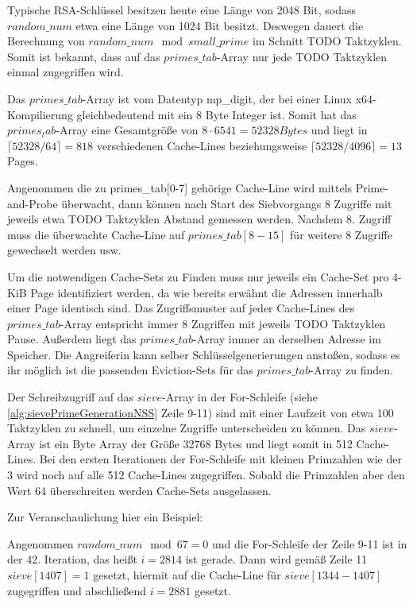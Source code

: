 Typische RSA-Schlüssel besitzen heute eine Länge von 2048 Bit, sodass $random\_num$ etwa eine Länge von 1024 Bit besitzt.
Deswegen dauert die Berechnung von $random\_num \mod small\_prime$ im Schnitt TODO Taktzyklen.
Somit ist bekannt, dass auf das $primes\_tab$-Array nur jede TODO Taktzyklen einmal zugegriffen wird.

Das $primes\_tab$-Array ist vom Datentyp mp_digit, der bei einer Linux x64-Kompilierung gleichbedeutend mit ein 8 Byte Integer ist.
Somit hat das $primes_tab$-Array eine Gesamtgröße von $8 \cdot 6541 = 52328 Bytes$ und liegt in $\lceil 52328 / 64 \rceil = 818$ verschiedenen Cache-Lines beziehungsweise $\lceil 52328 / 4096 \rceil = 13$ Pages.

Angenommen die zu primes_tab[0-7] gehörige Cache-Line wird mittels Prime-and-Probe überwacht, dann können nach Start des Siebvorgangs 8 Zugriffe mit jeweils etwa TODO Taktzyklen Abstand gemessen werden.
Nachdem 8. Zugriff muss die überwachte Cache-Line auf $primes\_tab[8-15]$ für weitere 8 Zugriffe gewechselt werden usw.

Um die notwendigen Cache-Sets zu Finden muss nur jeweils ein Cache-Set pro 4-KiB Page identifiziert werden, da wie bereits erwähnt die Adressen innerhalb einer Page identisch sind.
Das Zugriffsmuster auf jeder Cache-Lines des $primes\_tab$-Array entspricht immer 8 Zugriffen mit jeweils TODO Taktzyklen Pause. Außerdem liegt das $primes\_tab$-Array immer an derselben Adresse im Speicher.
Die Angreiferin kann selber Schlüsselgenerierungen anstoßen, sodass es ihr möglich ist die passenden Eviction-Sets für das $primes\_tab$-Array zu finden.

Der Schreibzugriff auf das $sieve$-Array in der For-Schleife (siehe \ref{alg:sievePrimeGenerationNSS} Zeile 9-11) sind mit einer Laufzeit von etwa 100 Taktzyklen zu schnell, um einzelne Zugriffe unterscheiden zu können.
Das $sieve$-Array ist ein Byte Array der Größe 32768 Bytes und liegt somit in 512 Cache-Lines.
Bei den ersten Iterationen der For-Schleife mit kleinen Primzahlen wie der 3 wird noch auf alle 512 Cache-Lines zugegriffen.
Sobald die Primzahlen aber den Wert 64 überschreiten werden Cache-Sets ausgelassen.

Zur Veranschaulichung hier ein Beispiel:

Angenommen $random\_num \mod 67 = 0$ und die For-Schleife der Zeile 9-11 ist in der 42. Iteration, das heißt $i=2814$ ist gerade.
Dann wird gemäß Zeile 11 $sieve[1407] = 1$ gesetzt, hiermit auf die Cache-Line für $sieve[1344-1407]$ zugegriffen und abschließend $i=2881$ gesetzt.

